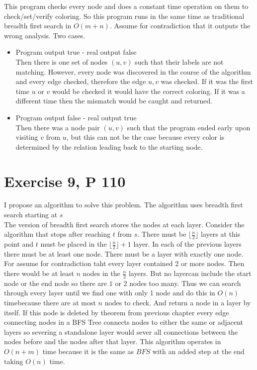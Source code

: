 \documentclass{amsart}
\begin{document}
This program checks every node and does a constant time operation on them to check/set/verify coloring.
So this program runs in the same time as traditional breadth first search in $O(m+n)$.
Assume for contradiction that it outputs the wrong analysis. Two cases.\\
\begin{itemize}
    \item Program output true - real output false\\
        Then there is one set of nodes $(u,v)$ such that their labels are not matching. However,
        every node was discovered in the course of the algorithm and every edge checked, therefore
        the edge $u,v$ was checked. If it was the first time $u$ or $v$ would be checked it would
        have the correct coloring. If it was a different time then the mismatch would be caught and returned.
    \item Program output false - real output true\\
        Then there was a node pair $(u,v)$ such that the program ended early upon visiting $v$ from $u$, but this 
        can not be the case because every color is determined by the relation leading back to the starting node.
\end{itemize}


\section{Exercise 9, P 110}
I propose an algorithm to solve this problem.
The algorithm uses breadth first search starting at $s$ \\
The version of breadth first search stores the nodes at each layer.
Consider the algorithm that stops after reaching $t$ from $s$.
There must be $\lfloor \frac{n}{2} \rfloor $ layers at this point and $t$ must be placed in the $\lfloor \frac{n}{2} \rfloor + 1$ layer.
In each of the previous layers there must be at least one node. There must be a layer with exactly one node. For assume
for contradiction taht every layer contained 2 or more nodes. Then there would be at least $n$ nodes in the $\frac{n}{2}$ layers.
But no layercan include the start node or the end node so there are $1$ or $2$ nodes too many. Thus we can search
through every layer until we find one with only 1 node and do this in $O(n)$ timebecause there are at most $n$ nodes to check.
And return a node in a layer by itself.
If this node is deleted by theorem from previous chapter every edge connecting nodes in a BFS Tree
connects nodes to either the same or adjacent layers so severing a standalone layer would 
sever all connections between the nodes before and the nodes after that layer. This algorithm operates
in $O(n+m)$ time because it is the same as $BFS$ with an added step at the end taking $O(n)$ time.
\end{document}
